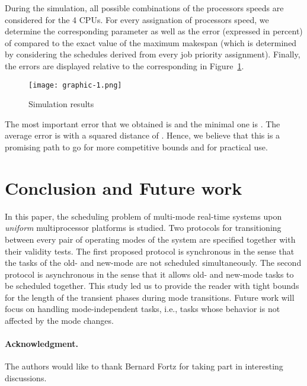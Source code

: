 \documentclass[10pt,english,a4paper]{article}
\newtheorem{validity test}{Validity Test}
\begin{document}
During the simulation, all possible combinations of the processors speeds are considered for the 4 CPUs. For every assignation of processors speed, we determine the corresponding parameter  as well as the error  (expressed in percent) of  compared to the exact value of the maximum makespan (which is determined by considering the schedules derived from every job priority assignment). Finally, the errors  are displayed relative to the corresponding  in Figure~\ref{fig:experiment}. 

\begin{figure}[!h]
\centering
\texttt{[image: graphic-1.png]}
\caption{Simulation results}
\label{fig:experiment}
\end{figure}

The most important error that we obtained is  and the minimal one is . The average error is  with a squared distance of . Hence, we believe that this is a promising path to go for more competitive bounds and for practical use.

\section{Conclusion and Future work}\label{Conclusion and future work}

In this paper, the scheduling problem of multi-mode real-time systems upon {\em uniform} multiprocessor platforms is studied. Two protocols for transitioning between every pair of operating modes of the system are specified together with their validity tests. The first proposed protocol  is synchronous in the sense that the tasks of the old- and new-mode are not scheduled simultaneously. The second protocol  is asynchronous in the sense that it allows old- and new-mode tasks to be scheduled together. This study led us to provide the reader with tight bounds for the length of the transient phases during mode transitions. Future work will focus on handling mode-independent tasks, i.e., tasks whose behavior is not affected by the mode changes. \\
\vspace{-0.3cm}

\paragraph{Acknowledgment.} The authors would like to thank Bernard Fortz for taking part in interesting discussions.



\end{document}
